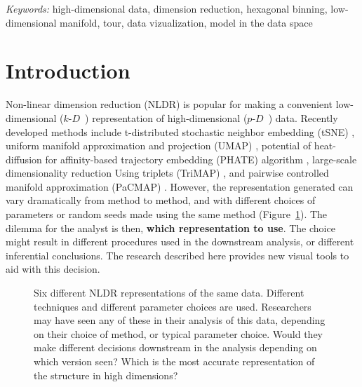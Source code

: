 \documentclass[
  12pt]{article}
\newcommand\pD{$p\text{-}D$\ }
\newcommand\kD{$k\text{-}D$\ }
\begin{document}
\noindent%
{\it Keywords:} high-dimensional data, dimension reduction, hexagonal
binning, low-dimensional manifold, tour, data vizualization, model in
the data space
\vfill

\newpage
{} %


\section{Introduction}\label{introduction}

Non-linear dimension reduction (NLDR) is popular for making a convenient
low-dimensional (\kD) representation of high-dimensional (\pD) data.
Recently developed methods include t-distributed stochastic neighbor
embedding (tSNE) \citep{laurens2008}, uniform manifold approximation and
projection (UMAP) \citep{leland2018}, potential of heat-diffusion for
affinity-based trajectory embedding (PHATE) algorithm \citep{moon2019},
large-scale dimensionality reduction Using triplets (TriMAP)
\citep{amid2022}, and pairwise controlled manifold approximation
(PaCMAP) \citep{yingfan2021}. However, the representation generated can
vary dramatically from method to method, and with different choices of
parameters or random seeds made using the same method
(Figure~\ref{fig-NLDR-variety}). The dilemma for the analyst is then,
\textbf{which representation to use}. The choice might result in
different procedures used in the downstream analysis, or different
inferential conclusions. The research described here provides new visual
tools to aid with this decision.

\begin{figure}


\caption{\label{fig-NLDR-variety}Six different NLDR representations of
the same data. Different techniques and different parameter choices are
used. Researchers may have seen any of these in their analysis of this
data, depending on their choice of method, or typical parameter choice.
Would they make different decisions downstream in the analysis depending
on which version seen? Which is the most accurate representation of the
structure in high dimensions?}

\end{figure}%
\end{document}
